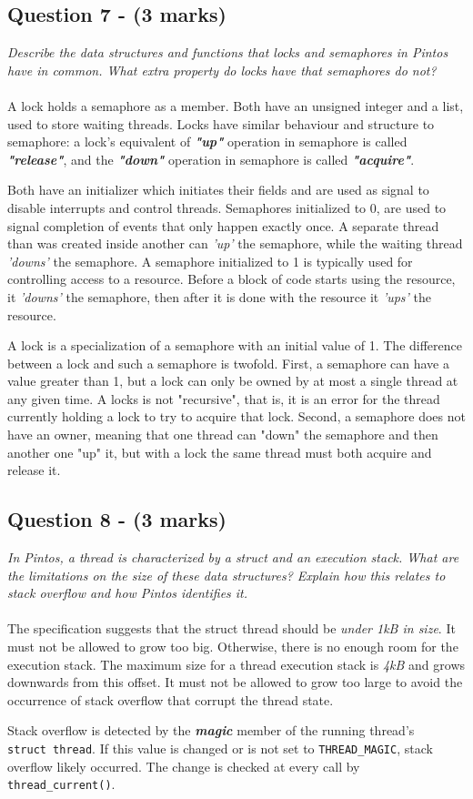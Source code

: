 \documentclass{article}
\begin{document}
\subsection*{Question 7 - (3 marks)}
\textit{Describe the data structures and functions that locks and semaphores in Pintos have in common. What extra property do locks have that semaphores do not?}
\\ \\
A lock holds a semaphore as a member. Both have an unsigned integer and a list, used to store waiting threads. Locks have similar behaviour and structure to semaphore: a lock's equivalent of \textbf{\textit{"up"}} operation in semaphore is called \textbf{\textit{"release"}}, and the \textbf{\textit{"down"}} operation in semaphore is called \textbf{\textit{"acquire"}}.
\par
Both have an initializer which initiates their fields and are used as signal to disable interrupts and control threads. Semaphores initialized to 0, are used to signal completion of events that only happen exactly once. A separate thread than was created inside another can \textit{'up'} the semaphore, while the waiting thread \textit{'downs'} the semaphore. A semaphore initialized to 1 is typically used for controlling access to a resource. Before a block of code starts using the resource, it \textit{'downs'} the semaphore, then after it is done with the resource it \textit{'ups'} the resource.
\par
A lock is a specialization of a semaphore with an initial value of 1.  The difference between a lock and such a semaphore is twofold.  First, a semaphore can have a value greater than 1, but a lock can only be owned by at most a single thread at any given time. A locks is not "recursive", that is, it is an error for the thread currently holding a lock to try to acquire that lock. Second, a semaphore does not have an owner, meaning that one thread can "down" the semaphore and then another one "up" it, but with a lock the same thread must both acquire and release it.


\subsection*{Question 8 - (3 marks)}
\textit{In Pintos, a thread is characterized by a struct and an execution stack. What are the limitations on the size of these data structures? Explain how this relates to stack overflow and how Pintos identifies it.}
\\ \\
The specification suggests that the struct thread should be \textit{under 1kB in size}. It must not be allowed to grow too big. Otherwise, there is no enough room for the execution stack. The maximum size for a thread execution stack is \textit{4kB} and grows downwards from this offset. It must not be allowed to grow too large to avoid the occurrence of stack overflow that corrupt the thread state.
\par
Stack overflow is detected by the \textbf{\textit{magic}} member of  the running thread's \texttt{struct\ thread}. If this value is changed or is not set to  \texttt{THREAD\_MAGIC}, stack overflow likely occurred. The change is checked at every call by \texttt{thread\_current()}.
\end{document}
